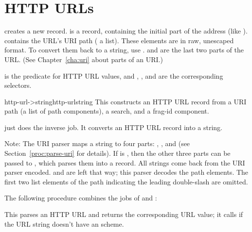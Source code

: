 \section{HTTP URLs}

%
\begin{desc}
   creates a new  record.
   is a record, containing the initial part of the address
  (like ).   contains the
  URL's URI path ( a list).  These elements are in raw, unescaped
  format. To convert them back to a string, use
  . 
  and  are the last two parts of the URL.  (See
  Chapter~\ref{cha:uri} about parts of an URI.)
  
   is the predicate for HTTP URL values, and
  , ,  and
   are the corresponding selectors.
\end{desc}

\begin{defundescx}{http-url->string}{http-url}{string}
  This constructs an HTTP URL record from a URI path (a list of path
  components), a search, and a frag-id component.
  
   just does the inverse job. It converts an
  HTTP URL record into a string.
\end{defundescx}
%
Note: The URI parser  maps a string to four parts:
, ,  and  (see
Section~\ref{proc:parse-uri} for details). If  is
, then the other three parts can be passed to
, which parses them into a  record.
All strings come back from the URI parser encoded.   and
 are left that way; this parser decodes the path
elements.  The first two list elements of the path indicating the
leading double-slash are omitted.

The following procedure combines the jobs of  and
:

\begin{desc}
  This parses an HTTP URL and returns the corresponding URL value; it
  calls  if the URL string doesn't have an
   scheme.
\end{desc}


